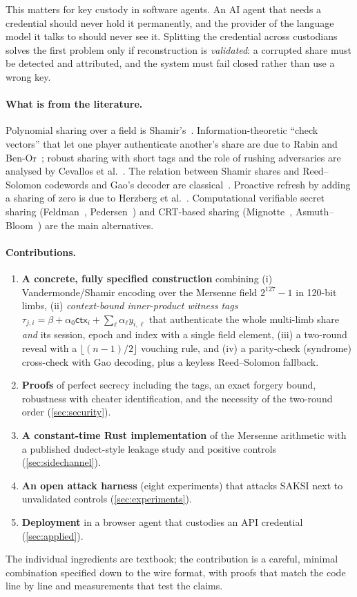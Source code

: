 \documentclass[11pt,a4paper]{article}
\theoremstyle{plain}
\theoremstyle{definition}
\newcommand{\ctx}{\mathsf{ctx}}
\begin{document}
This matters for key custody in software agents. An AI agent that needs a credential should never
hold it permanently, and the provider of the language model it talks to should never see it.
Splitting the credential across custodians solves the first problem only if reconstruction is
\emph{validated}: a corrupted share must be detected and attributed, and the system must fail
closed rather than use a wrong key.

\paragraph{What is from the literature.}
Polynomial sharing over a field is Shamir's~\cite{shamir79}. Information-theoretic ``check
vectors'' that let one player authenticate another's share are due to Rabin and
Ben-Or~\cite{rabinbenor89}; robust sharing with short tags and the role of rushing adversaries are
analysed by Cevallos et al.~\cite{cfor12}. The relation between Shamir shares and Reed--Solomon
codewords and Gao's decoder are classical~\cite{gao02}. Proactive refresh by adding a sharing of
zero is due to Herzberg et al.~\cite{herzberg95}. Computational verifiable secret sharing
(Feldman~\cite{feldman87}, Pedersen~\cite{pedersen91}) and CRT-based sharing
(Mignotte~\cite{mignotte83}, Asmuth--Bloom~\cite{asmuthbloom83}) are the main alternatives.

\paragraph{Contributions.}
\begin{enumerate}
  \item \textbf{A concrete, fully specified construction} combining (i) Vandermonde/Shamir encoding over
  the Mersenne field $2^{127}-1$ in 120-bit limbs, (ii) \emph{context-bound inner-product witness
  tags} $\tau_{j,i}=\beta+\alpha_0\ctx_i+\sum_\ell\alpha_\ell y_{i,\ell}$ that authenticate the whole
  multi-limb share \emph{and} its session, epoch and index with a single field element,
  (iii) a two-round reveal with a $\lfloor (n-1)/2\rfloor$ vouching rule, and (iv) a parity-check
  (syndrome) cross-check with Gao decoding, plus a keyless Reed--Solomon fallback.
  \item \textbf{Proofs} of perfect secrecy including the tags, an exact forgery bound, robustness with
  cheater identification, and the necessity of the two-round order (\cref{sec:security}).
  \item \textbf{A constant-time Rust implementation} of the Mersenne arithmetic with a published
  dudect-style leakage study and positive controls (\cref{sec:sidechannel}).
  \item \textbf{An open attack harness} (eight experiments) that attacks SAKSI next to unvalidated
  controls (\cref{sec:experiments}).
  \item \textbf{Deployment} in a browser agent that custodies an API credential (\cref{sec:applied}).
\end{enumerate}
The individual ingredients are textbook; the contribution is a careful, minimal combination
specified down to the wire format, with proofs that match the code line by line and measurements
that test the claims.
\end{document}

